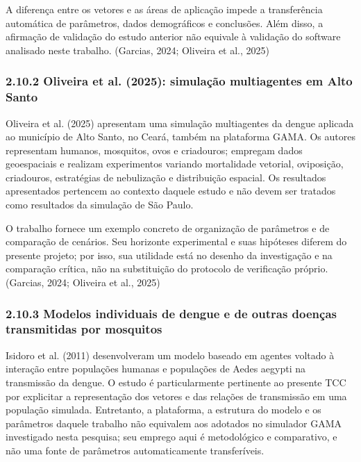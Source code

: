A diferença entre os vetores e as áreas de aplicação impede a
transferência automática de parâmetros, dados demográficos e conclusões.
Além disso, a afirmação de validação do estudo anterior não equivale à
validação do software analisado neste trabalho. (Garcias, 2024; Oliveira
et al., 2025)

\subsubsection{2.10.2 Oliveira et al. (2025): simulação multiagentes em
Alto
Santo}\label{oliveira-et-al.-2025-simulauxe7uxe3o-multiagentes-em-alto-santo}

Oliveira et al. (2025) apresentam uma simulação multiagentes da dengue
aplicada ao município de Alto Santo, no Ceará, também na plataforma
GAMA. Os autores representam humanos, mosquitos, ovos e criadouros;
empregam dados geoespaciais e realizam experimentos variando mortalidade
vetorial, oviposição, criadouros, estratégias de nebulização e
distribuição espacial. Os resultados apresentados pertencem ao contexto
daquele estudo e não devem ser tratados como resultados da simulação de
São Paulo.

O trabalho fornece um exemplo concreto de organização de parâmetros e de
comparação de cenários. Seu horizonte experimental e suas hipóteses
diferem do presente projeto; por isso, sua utilidade está no desenho da
investigação e na comparação crítica, não na substituição do protocolo
de verificação próprio. (Garcias, 2024; Oliveira et al., 2025)

\subsubsection{2.10.3 Modelos individuais de dengue e de outras doenças
transmitidas por
mosquitos}\label{modelos-individuais-de-dengue-e-de-outras-doenuxe7as-transmitidas-por-mosquitos}

Isidoro et al. (2011) desenvolveram um modelo baseado em agentes voltado
à interação entre populações humanas e populações de Aedes aegypti na
transmissão da dengue. O estudo é particularmente pertinente ao presente
TCC por explicitar a representação dos vetores e das relações de
transmissão em uma população simulada. Entretanto, a plataforma, a
estrutura do modelo e os parâmetros daquele trabalho não equivalem aos
adotados no simulador GAMA investigado nesta pesquisa; seu emprego aqui
é metodológico e comparativo, e não uma fonte de parâmetros
automaticamente transferíveis.

